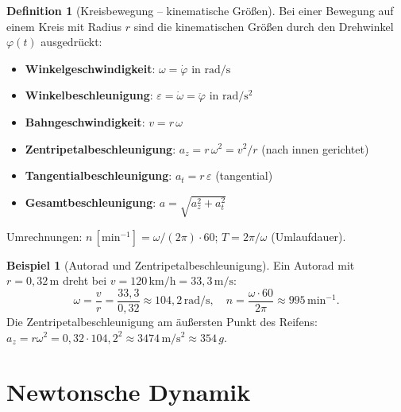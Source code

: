 ﻿\documentclass[a4paper,12pt]{report}
\theoremstyle{definition}
\newtheorem{definition}{Definition}
\newtheorem{beispiel}{Beispiel}
\begin{document}
\begin{definition}[Kreisbewegung -- kinematische Gr\"o\ss{}en]
Bei einer Bewegung auf einem Kreis mit Radius $r$ sind die kinematischen
Gr\"o\ss{}en durch den Drehwinkel $\varphi(t)$ ausgedr\"uckt:
\begin{itemize}
    \item[-] \textbf{Winkelgeschwindigkeit}: $\omega = \dot{\varphi}$ in $\mathrm{rad/s}$
    \item[-] \textbf{Winkelbeschleunigung}: $\varepsilon = \dot{\omega} = \ddot{\varphi}$ in $\mathrm{rad/s^2}$
    \item[-] \textbf{Bahngeschwindigkeit}: $v = r\,\omega$
    \item[-] \textbf{Zentripetalbeschleunigung}: $a_z = r\,\omega^2 = v^2/r$ (nach innen gerichtet)
    \item[-] \textbf{Tangentialbeschleunigung}: $a_t = r\,\varepsilon$ (tangential)
    \item[-] \textbf{Gesamtbeschleunigung}: $a = \sqrt{a_z^2 + a_t^2}$
\end{itemize}
Umrechnungen: $n\,[\mathrm{min^{-1}}] = \omega/(2\pi)\cdot 60$; $T = 2\pi/\omega$ (Umlaufdauer).
\end{definition}

\begin{beispiel}[Autorad und Zentripetalbeschleunigung]
Ein Autorad mit $r = 0{,}32\,\mathrm{m}$ dreht bei $v = 120\,\mathrm{km/h} = 33{,}3\,\mathrm{m/s}$:
\[
  \omega = \frac{v}{r} = \frac{33{,}3}{0{,}32} \approx 104{,}2\,\mathrm{rad/s}, \quad
  n = \frac{\omega\cdot 60}{2\pi} \approx 995\,\mathrm{min^{-1}}.
\]
Die Zentripetalbeschleunigung am \"au\ss{}ersten Punkt des Reifens:
$a_z = r\omega^2 = 0{,}32\cdot104{,}2^2 \approx 3474\,\mathrm{m/s^2} \approx 354\,g$.
\end{beispiel}

\section{Newtonsche Dynamik}
\end{document}
